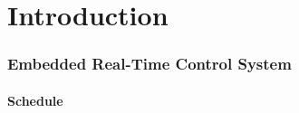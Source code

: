 \section{Introduction}%


\begin{frame}
    \frametitle{Embedded Real-Time Control System}
    \framesubtitle<7>{Schedule}
    \begin{figure}[h]
        \centering
        \only<2>{}%
        \only<3>{}%
        \only<8>{}%
        \only<9>{}%
        \only<10>{}%
    \end{figure}
\end{frame}


